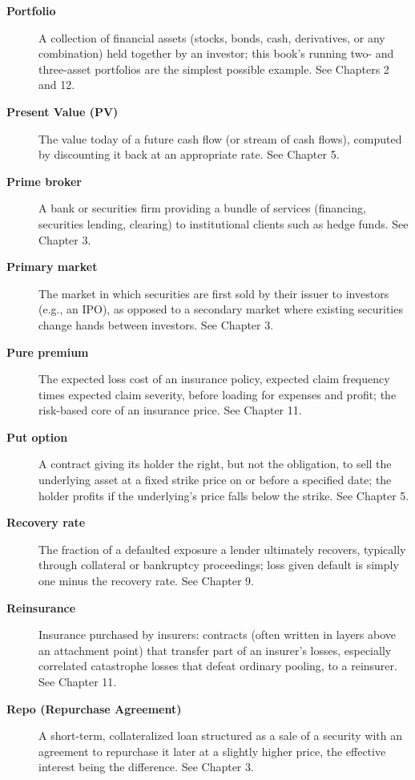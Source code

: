 \documentclass[../ai_in_finance]{subfiles}
\begin{document}
\begin{description}
\item[\textbf{Portfolio}] A collection of financial assets (stocks, bonds, cash, derivatives, or any combination) held together by an investor; this book's running two- and three-asset portfolios are the simplest possible example. See Chapters 2 and 12.

\item[\textbf{Present Value (PV)}] The value today of a future cash flow (or stream of cash flows), computed by discounting it back at an appropriate rate. See Chapter 5.

\item[\textbf{Prime broker}] A bank or securities firm providing a bundle of services (financing, securities lending, clearing) to institutional clients such as hedge funds. See Chapter 3.

\item[\textbf{Primary market}] The market in which securities are first sold by their issuer to investors (e.g., an IPO), as opposed to a secondary market where existing securities change hands between investors. See Chapter 3.

\item[\textbf{Pure premium}] The expected loss cost of an insurance policy, expected claim frequency times expected claim severity, before loading for expenses and profit; the risk-based core of an insurance price. See Chapter 11.

\item[\textbf{Put option}] A contract giving its holder the right, but not the obligation, to sell the underlying asset at a fixed strike price on or before a specified date; the holder profits if the underlying's price falls below the strike. See Chapter 5.

\item[\textbf{Recovery rate}] The fraction of a defaulted exposure a lender ultimately recovers, typically through collateral or bankruptcy proceedings; loss given default is simply one minus the recovery rate. See Chapter 9.

\item[\textbf{Reinsurance}] Insurance purchased by insurers: contracts (often written in layers above an attachment point) that transfer part of an insurer's losses, especially correlated catastrophe losses that defeat ordinary pooling, to a reinsurer. See Chapter 11.

\item[\textbf{Repo (Repurchase Agreement)}] A short-term, collateralized loan structured as a sale of a security with an agreement to repurchase it later at a slightly higher price, the effective interest being the difference. See Chapter 3.


\end{description}
\end{document}
